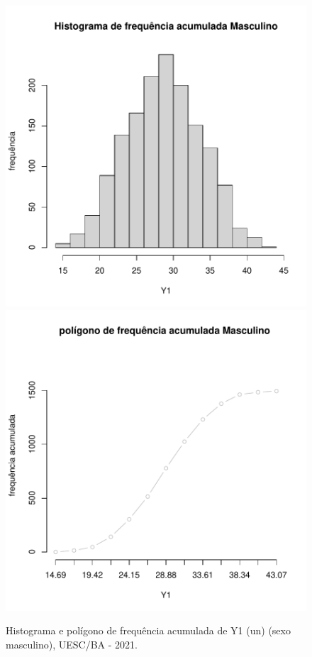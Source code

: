 \documentclass[12pt]{article}\usepackage[]{graphicx}\usepackage[]{color}
\newenvironment{knitrout}{}{} %
\begin{document}
\begin{figure}[!h]
\label{figura:Histograma-Poligono-M}
\begin{knitrout}
\color{fgcolor}

{\centering \includegraphics[width=.4\linewidth]{figure/minimal-Histograma-Poligono-Masc-1} 
\includegraphics[width=.4\linewidth]{figure/minimal-Histograma-Poligono-Masc-2} 

}


\end{knitrout}
\caption{Histograma e polígono de frequência acumulada de Y1 (un) (sexo masculino), UESC/BA - 2021.
}
\end{figure}
\end{document}

